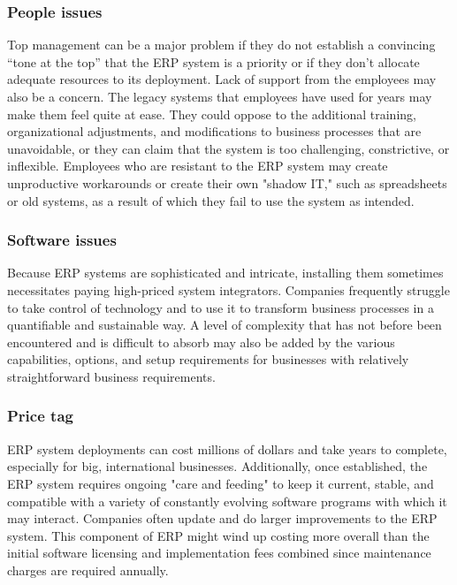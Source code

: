 \subsubsection{People issues}
Top management can be a major problem if they do not establish a convincing “tone at the top” that the ERP system is a priority or if they don’t allocate adequate resources to its deployment.
Lack of support from the employees may also be a concern. The legacy systems that employees have used for years may make them feel quite at ease. They could oppose to the additional training, organizational adjustments, and modifications to business processes that are unavoidable, or they can claim that the system is too challenging, constrictive, or inflexible.
Employees who are resistant to the ERP system may create unproductive workarounds or create their own "shadow IT," such as spreadsheets or old systems, as a result of which they fail to use the system as intended.

\subsubsection{Software issues}
Because ERP systems are sophisticated and intricate, installing them sometimes necessitates paying high-priced system integrators. Companies frequently struggle to take control of technology and to use it to transform business processes in a quantifiable and sustainable way. A level of complexity that has not before been encountered and is difficult to absorb may also be added by the various capabilities, options, and setup requirements for businesses with relatively straightforward business requirements.

\subsubsection{Price tag}
ERP system deployments can cost millions of dollars and take years to complete, especially for big, international businesses. Additionally, once established, the ERP system requires ongoing "care and feeding" to keep it current, stable, and compatible with a variety of constantly evolving software programs with which it may interact. Companies often update and do larger improvements to the ERP system. This component of ERP might wind up costing more overall than the initial software licensing and implementation fees combined since maintenance charges are required annually.


